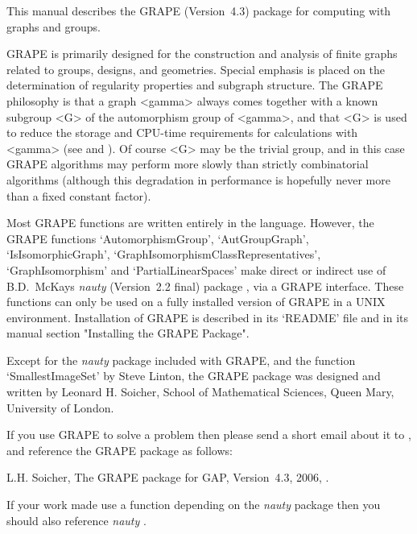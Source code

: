 %
%
%
%
\def\GRAPE{\sf GRAPE}
\def\nauty{\it nauty}
\def\Aut{{\rm Aut}\,} 


This manual describes the {\GRAPE} (Version~4.3) package for computing
with graphs and groups.

{\GRAPE} is primarily designed for the construction and analysis of
finite graphs related to groups, designs, and geometries. Special
emphasis is placed on the determination of regularity properties and
subgraph structure. The {\GRAPE} philosophy is that a graph <gamma>
always comes together with a known subgroup <G> of the automorphism
group of <gamma>, and that <G> is used to reduce the storage and
CPU-time requirements for calculations with <gamma> (see
\cite{Soi93} and \cite{Soi04}).  Of course <G> may be the trivial group,
and in this case {\GRAPE} algorithms may perform more slowly than strictly
combinatorial algorithms (although this degradation in performance is
hopefully never more than a fixed constant factor).

Most {\GRAPE} functions are written entirely in the {\GAP} language.
However, the {\GRAPE} functions `AutomorphismGroup', `AutGroupGraph',
`IsIsomorphicGraph', `GraphIsomorphismClassRepresentatives',
`GraphIsomorphism'  and `PartialLinearSpaces' make direct or indirect use
of B.D.~McKay{\pif}s {\nauty} (Version~2.2 final) package \cite{Nau90},
via a {\GRAPE} interface.  These functions can only be used on a fully
installed version of {\GRAPE} in a UNIX environment.  Installation of
{\GRAPE} is described in its `README' file and in its manual section
"Installing the GRAPE Package".

Except for the {\nauty} package included with {\GRAPE}, and the function
`SmallestImageSet' by Steve Linton, the {\GRAPE} package was designed
and written by Leonard H. Soicher, School of Mathematical Sciences,
Queen Mary, University of London.

If you use {\GRAPE} to solve a problem then please send a short email
about it to , and reference the {\GRAPE} 
package as follows:

L.H. Soicher, The {GRAPE} package for {GAP}, Version~4.3, 2006,
.

If your work made use a function depending on the {\nauty} package then
you should also reference {\nauty} \cite{Nau90}.


